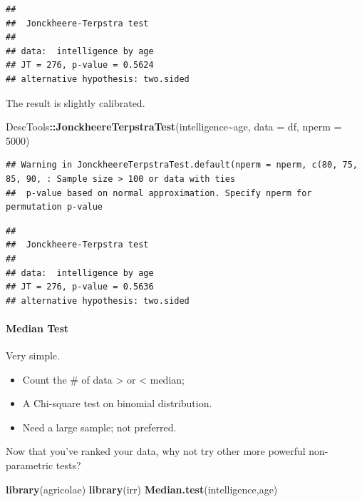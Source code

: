 \documentclass[
]{ctexart}
\newenvironment{Shaded}{\begin{snugshade}}{\end{snugshade}}
\newcommand{\AttributeTok}[1]{\textcolor[rgb]{0.13,0.29,0.53}{#1}}
\newcommand{\DecValTok}[1]{\textcolor[rgb]{0.00,0.00,0.81}{#1}}
\newcommand{\FunctionTok}[1]{\textcolor[rgb]{0.13,0.29,0.53}{\textbf{#1}}}
\newcommand{\NormalTok}[1]{#1}
\newcommand{\SpecialCharTok}[1]{\textcolor[rgb]{0.81,0.36,0.00}{\textbf{#1}}}
\providecommand{\tightlist}{%
  \setlength{\itemsep}{0pt}\setlength{\parskip}{0pt}}
\begin{document}
\begin{verbatim}
## 
##  Jonckheere-Terpstra test
## 
## data:  intelligence by age
## JT = 276, p-value = 0.5624
## alternative hypothesis: two.sided
\end{verbatim}

The result is slightly calibrated.

\begin{Shaded}
\begin{Highlighting}[]
\NormalTok{DescTools}\SpecialCharTok{::}\FunctionTok{JonckheereTerpstraTest}\NormalTok{(intelligence}\SpecialCharTok{\textasciitilde{}}\NormalTok{age,}
                                  \AttributeTok{data =}\NormalTok{ df,}
                                  \AttributeTok{nperm =} \DecValTok{5000}\NormalTok{)}
\end{Highlighting}
\end{Shaded}

\begin{verbatim}
## Warning in JonckheereTerpstraTest.default(nperm = nperm, c(80, 75, 85, 90, : Sample size > 100 or data with ties 
##  p-value based on normal approximation. Specify nperm for permutation p-value
\end{verbatim}

\begin{verbatim}
## 
##  Jonckheere-Terpstra test
## 
## data:  intelligence by age
## JT = 276, p-value = 0.5636
## alternative hypothesis: two.sided
\end{verbatim}

\hypertarget{median-test}{%
\paragraph{Median Test}\label{median-test}}

Very simple.

\begin{itemize}
\tightlist
\item
  Count the \# of data \textgreater{} or \textless{} median;
\item
  A Chi-square test on binomial distribution.
\item
  Need a large sample; not preferred.
\end{itemize}

Now that you've ranked your data, why not try other more powerful
non-parametric tests?

\begin{Shaded}
\begin{Highlighting}[]
\FunctionTok{library}\NormalTok{(agricolae)}
\FunctionTok{library}\NormalTok{(irr)}
\FunctionTok{Median.test}\NormalTok{(intelligence,age)}
\end{Highlighting}
\end{Shaded}
\end{document}
